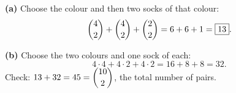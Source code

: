 \textbf{(a)} Choose the colour and then two socks of that colour:
\[
\dbinom42+\dbinom42+\dbinom22=6+6+1=\boxed{13}.
\]

\textbf{(b)} Choose the two colours and one sock of each:
\[
4\cdot4+4\cdot2+4\cdot2=16+8+8=\boxed{32}.
\]
Check: $13+32=45=\dbinom{10}{2}$, the total number of pairs.
